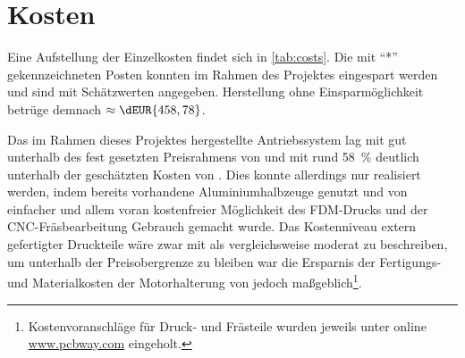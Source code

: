 	\section{Kosten}\label{sec:cost}
		Eine Aufstellung der Einzelkosten findet sich in \cref{tab:costs}.
		Die mit ``*'' gekennzeichneten Posten konnten im Rahmen des Projektes eingespart werden und sind mit Schätzwerten angegeben.
		Herstellung ohne Einsparmöglichkeit betrüge demnach \(\approx \dEUR{458,78}\).

		Das im Rahmen dieses Projektes hergestellte Antriebssystem lag mit  gut unterhalb des fest gesetzten Preisrahmens von  und mit rund \qty{58}{\percent} deutlich unterhalb der geschätzten Kosten von .
		Dies konnte allerdings nur realisiert werden, indem bereits vorhandene Aluminiumhalbzeuge genutzt und von einfacher und allem voran kostenfreier Möglichkeit des FDM-Drucks und der CNC-Fräsbearbeitung Gebrauch gemacht wurde.
		Das Kostenniveau extern gefertigter Druckteile wäre zwar mit  als vergleichsweise moderat zu beschreiben, um unterhalb der Preisobergrenze zu bleiben war die Ersparnis der Fertigungs- und Materialkosten der Motorhalterung von  jedoch maßgeblich\footnote{\hspace{1mm}Kostenvoranschläge für Druck- und Frästeile wurden jeweils unter online \url{www.pcbway.com} eingeholt.}.
		\newpage
